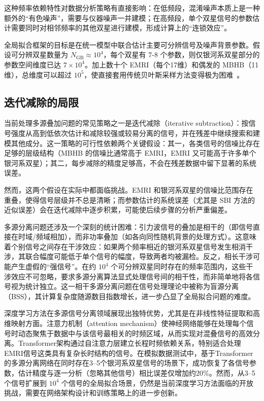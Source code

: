 这种频率依赖特性对数据分析策略有直接影响：在低频段，混淆噪声本质上是一种额外的“有色噪声”，需要与仪器噪声一并建模；在高频段，单个双星信号的参数估计需要同时对相邻频率的其他双星进行建模，形成计算上的“连锁效应”。

全局拟合框架的目标是在统一模型中联合估计主要可分辨信号及噪声背景参数。假设可分辨双星数量为 $N_\mathrm{GB} \approx 10^4$，每个双星有 7-8 个参数，则仅银河系双星部分的参数空间维度已达 $7 \times 10^4$。加上数十个 EMRI（每个17维）和偶发的 MBHB（11维），总维度可以超过 $10^5$，使直接套用传统贝叶斯采样方法变得极为困难~\cite{wang2024challenges}。

\subsection{迭代减除的局限}

当前处理多源叠加问题的常见策略之一是迭代减除（iterative subtraction）：按信号强度从高到低依次估计和减除较强或较易分离的信号，并在残差中继续搜索和建模其他成分。这一策略的可行性依赖两个关键假设：其一，各类信号的信噪比存在足够的层级结构（MBHB 的信噪比通常高于 EMRI，EMRI 又可能高于许多单个银河系双星）；其二，每步减除的精度足够高，不会在残差数据中留下显著的系统误差。

然而，这两个假设在实际中都面临挑战。EMRI 和银河系双星的信噪比范围存在重叠，使得信号层级并不总是清晰；而参数估计的系统误差（尤其是 SBI 方法的近似误差）会在迭代减除中逐步积累，可能使后续步骤的分析严重偏差。

多源分离问题还涉及一个深刻的统计困难：引力波信号的叠加是相干的（即信号直接在时域/频域相加），而非功率叠加（如各向同性随机背景的处理方式）。这意味着个别信号之间存在干涉效应：如果两个频率相近的银河系双星信号发生相消干涉，其联合幅度可能低于单个信号的幅度，导致两者均被漏检。反之，相长干涉可能产生虚假的“强信号”。在约 $10^4$ 个可分辨双星同时存在的频率范围内，这些干涉效应不可忽略，要求多源分离算法显式处理信号间的相干性，而非简单地将各信号视为统计独立。这一相干多源分离问题在信号处理理论中被称为盲源分离（BSS），其计算复杂度随源数目指数增长，进一步凸显了全局拟合问题的难度。

深度学习方法在多源信号分离领域展现出独特优势，尤其是在非线性特征提取和高维映射方面。注意力机制（attention mechanism）使神经网络能够在处理每个信号时动态聚焦于数据中与该信号最相关的时频区域，从而实现对混叠信号的高效分离。Transformer架构通过自注意力层建立长程时频依赖关系，特别适合处理EMRI信号这类具有复杂长时结构的信号。在模拟数据测试中，基于Transformer的多源分离网络在同时存在3--5个银河系双星信号的场景下，成功恢复了各信号参数，估计精度与逐一分析（忽略其他信号）相比误差仅增加约20\%。然而，从3--5个信号扩展到 $10^4$ 个信号的全局拟合场景，仍然是当前深度学习方法面临的开放挑战，需要在网络架构设计和训练策略上的进一步创新。

